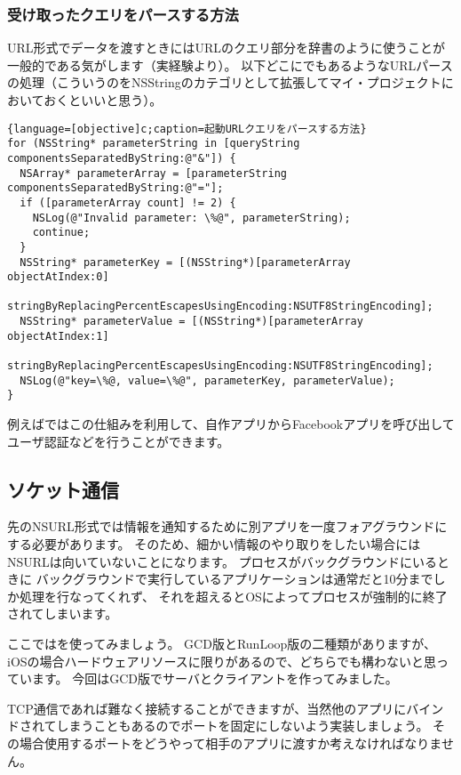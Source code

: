 \subsubsection{受け取ったクエリをパースする方法}
URL形式でデータを渡すときにはURLのクエリ部分を辞書のように使うことが一般的である気がします（実経験より）。
以下どこにでもあるようなURLパースの処理（こういうのをNSStringのカテゴリとして拡張してマイ・プロジェクトにおいておくといいと思う）。
\begin{lstlisting}{language=[objective]c;caption=起動URLクエリをパースする方法}
for (NSString* parameterString in [queryString componentsSeparatedByString:@"&"]) {
  NSArray* parameterArray = [parameterString componentsSeparatedByString:@"="];
  if ([parameterArray count] != 2) {
	NSLog(@"Invalid parameter: \%@", parameterString);
	continue;
  }
  NSString* parameterKey = [(NSString*)[parameterArray objectAtIndex:0]
	stringByReplacingPercentEscapesUsingEncoding:NSUTF8StringEncoding];
  NSString* parameterValue = [(NSString*)[parameterArray objectAtIndex:1]
	stringByReplacingPercentEscapesUsingEncoding:NSUTF8StringEncoding];
  NSLog(@"key=\%@, value=\%@", parameterKey, parameterValue);
}
\end{lstlisting}
例えばではこの仕組みを利用して、自作アプリからFacebookアプリを呼び出してユーザ認証などを行うことができます。

\subsection{ソケット通信}
先のNSURL形式では情報を通知するために別アプリを一度フォアグラウンドにする必要があります。
そのため、細かい情報のやり取りをしたい場合にはNSURLは向いていないことになります。
プロセスがバックグラウンドにいるときに
バックグラウンドで実行しているアプリケーションは通常だと10分までしか処理を行なってくれず、
それを超えるとOSによってプロセスが強制的に終了されてしまいます。

ここではを使ってみましょう。
GCD版とRunLoop版の二種類がありますが、iOSの場合ハードウェアリソースに限りがあるので、どちらでも構わないと思っています。
今回はGCD版でサーバとクライアントを作ってみました。

TCP通信であれば難なく接続することができますが、当然他のアプリにバインドされてしまうこともあるのでポートを固定にしないよう実装しましょう。
その場合使用するポートをどうやって相手のアプリに渡すか考えなければなりません。

